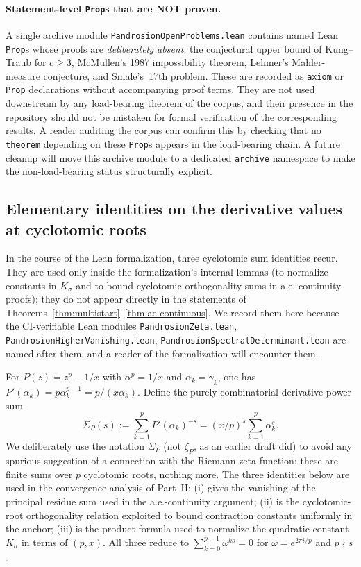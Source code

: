 \documentclass[11pt,a4paper]{article}
\theoremstyle{definition}
\begin{document}
\paragraph{Statement-level \texttt{Prop}s that are NOT proven.} A single archive module \texttt{PandrosionOpenProblems.lean} contains named Lean \texttt{Prop}s whose proofs are \emph{deliberately absent}: the conjectural upper bound of Kung--Traub for $c \geq 3$, McMullen's 1987 impossibility theorem, Lehmer's Mahler-measure conjecture, and Smale's~17th problem. These are recorded as \texttt{axiom} or \texttt{Prop} declarations without accompanying proof terms. They are not used downstream by any load-bearing theorem of the corpus, and their presence in the repository should not be mistaken for formal verification of the corresponding results. A reader auditing the corpus can confirm this by checking that no \texttt{theorem} depending on these \texttt{Prop}s appears in the load-bearing chain. A future cleanup will move this archive module to a dedicated \texttt{archive} namespace to make the non-load-bearing status structurally explicit.

\subsection{Elementary identities on the derivative values at cyclotomic roots}

In the course of the Lean formalization, three cyclotomic sum identities recur. They are used only inside the formalization's internal lemmas (to normalize constants in $K_\sigma$ and to bound cyclotomic orthogonality sums in a.e.-continuity proofs); they do not appear directly in the statements of Theorems~\ref{thm:multistart}--\ref{thm:ae-continuous}. We record them here because the CI-verifiable Lean modules \texttt{PandrosionZeta.lean}, \texttt{PandrosionHigherVanishing.lean}, \texttt{PandrosionSpectralDeterminant.lean} are named after them, and a reader of the formalization will encounter them.

For $P(z) = z^p - 1/x$ with $\alpha^p = 1/x$ and $\alpha_k = \gamma_k$, one has $P'(\alpha_k) = p\alpha_k^{p-1} = p/(x\alpha_k)$. Define the purely combinatorial derivative-power sum
\[
  \Sigma_P(s) := \sum_{k=1}^p P'(\alpha_k)^{-s}
             = (x/p)^{s}\sum_{k=1}^p \alpha_k^{s}.
\]
We deliberately use the notation $\Sigma_P$ (not $\zeta_P$, as an earlier draft did) to avoid any spurious suggestion of a connection with the Riemann zeta function; these are finite sums over $p$ cyclotomic roots, nothing more. The three identities below are used in the convergence analysis of Part~II: (i) gives the vanishing of the principal residue sum used in the a.e.-continuity argument; (ii) is the cyclotomic-root orthogonality relation exploited to bound contraction constants uniformly in the anchor; (iii) is the product formula used to normalize the quadratic constant $K_\sigma$ in terms of $(p, x)$. All three reduce to $\sum_{k=0}^{p-1} \omega^{ks} = 0$ for $\omega = e^{2\pi i/p}$ and $p \nmid s$.
\end{document}

